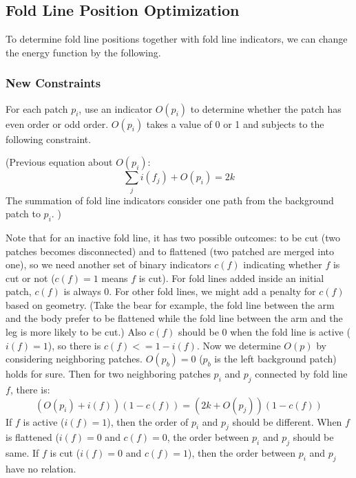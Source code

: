 \documentclass{article}
\begin{document}

\subsection{Fold Line Position Optimization}
To determine fold line positions together with fold line indicators, we can change the energy function by the following.
\subsubsection{New Constraints}
For each patch $p_i$, use an indicator $O(p_i)$ to determine whether the patch has even order or odd order. $O(p_i)$ takes a value of 0 or 1 and subjects to the following constraint.

\color{red}
(Previous equation about $O(p_i)$:
\begin{equation}
  \sum_j{i(f_j)} + O(p_i) = 2k
\end{equation}
The summation of fold line indicators consider one path from the background patch to $p_i$.
)
\color{blue}

Note that for an inactive fold line, it has two possible outcomes: to be cut (two patches becomes disconnected) and to flattened (two patched are merged into one), so we need another set of binary indicators $c(f)$ indicating whether $f$ is cut or not ($c(f) = 1$ means $f$ is cut). For fold lines added inside an initial patch, $c(f)$ is always $0$. For other fold lines, we might add a penalty for $c(f)$ based on geometry. (Take the bear for example, the fold line between the arm and the body prefer to be flattened while the fold line between the arm and the leg is more likely to be cut.) Also $c(f)$ should be $0$ when the fold line is active ($i(f) = 1$), so there is $c(f) <= 1 - i(f)$. Now we determine $O(p)$ by considering neighboring patches. $O(p_b) = 0$ ($p_b$ is the left background patch) holds for sure. Then for two neighboring patches $p_i$ and $p_j$ connected by fold line $f$, there is:
\begin{equation}
  (O(p_i) + i(f))(1 - c(f)) = (2k + O(p_j))(1 - c(f))
\end{equation}
If $f$ is active ($i(f) = 1$), then the order of $p_i$ and $p_j$ should be different. When $f$ is flattened ($i(f) = 0$ and $c(f) = 0$, the order between $p_i$ and $p_j$ should be same. If $f$ is cut ($i(f) = 0$ and $c(f) = 1$), then the order between $p_i$ and $p_j$ have no relation.
\end{document}
